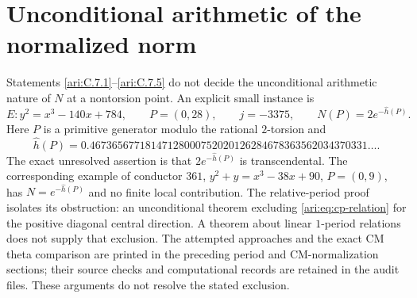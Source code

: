 \section{Unconditional arithmetic of the normalized norm}\label{ari:open:norm}

Statements \ref{ari:C.7.1}--\ref{ari:C.7.5} do not decide the unconditional
arithmetic nature of $N$ at a nontorsion point. An explicit
small instance is
\[
 E:y^2=x^3-140x+784,\qquad P=(0,28),\qquad j=-3375,
 \qquad N(P)=2e^{-\widehat h(P)}.
\]
Here $P$ is a primitive generator modulo the rational
$2$-torsion and
\[
 \widehat h(P)=
 0.46736567718147128000752020126284678363562034370331\ldots.
\]
The exact unresolved assertion is that $2e^{-\widehat h(P)}$
is transcendental. The corresponding example of conductor
$361$, $y^2+y=x^3-38x+90$, $P=(0,9)$, has
$N=e^{-\widehat h(P)}$ and no finite local contribution.
The relative-period proof isolates its obstruction: an
unconditional theorem excluding
\eqref{ari:eq:cp-relation} for the positive diagonal central
direction. A theorem about linear $1$-period relations
does not supply that exclusion. The attempted approaches and the exact CM theta comparison are printed in the preceding period and CM-normalization sections;
their source checks and computational records are retained in the audit files.
These arguments do not resolve the stated exclusion.

\clearpage
